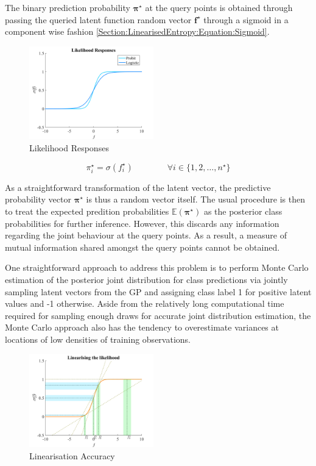 \documentclass{article}
\renewcommand{\vec}[1]{\boldsymbol{#1}}
\begin{document}
		The binary prediction probability $\vec{\pi^{\star}}$ at the query points is obtained through passing the queried latent function random vector $\vec{f}^{\star}$ through a sigmoid in a component wise fashion \eqref{Section:LinearisedEntropy:Equation:Sigmoid}.
		
		\begin{figure}[!htbp]
			\centering
				\includegraphics[width=0.48\textwidth]{Figures/responses.png}
			\caption{Likelihood Responses}
			\label{Figure:LikelihoodResponses}
		\end{figure}
		
		\begin{equation}
			\pi^{\star}_{i} = \sigma(f^{\star}_{i}) \qquad \qquad \forall i \in \{1, 2, \dots, n^{\star}\}
		\label{Section:LinearisedEntropy:Equation:Sigmoid}
		\end{equation}
		
		As a straightforward transformation of the latent vector, the predictive probability vector $\vec{\pi^{\star}}$ is thus a random vector itself. The usual procedure is then to treat the expected predition probabilities $\mathbb{E}(\vec{\pi^{\star}})$ as the posterior class probabilities for further inference. However, this discards any information regarding the joint behaviour at the query points. As a result, a measure of mutual information shared amongst the query points cannot be obtained.
		
		One straightforward approach to address this problem is to perform Monte Carlo estimation of the posterior joint distribution for class predictions via jointly sampling latent vectors from the GP and assigning class label 1 for positive latent values and -1 otherwise. Aside from the relatively long computational time required for sampling enough draws for accurate joint distribution estimation, the Monte Carlo approach also has the tendency to overestimate variances at locations of low densities of training observations.

		\begin{figure}[!htbp]
			\centering
				\includegraphics[width=0.48\textwidth]{Figures/linearisation.png}
			\caption{Linearisation Accuracy}
			\label{Figure:Linearisation}
		\end{figure}
				
\end{document}
